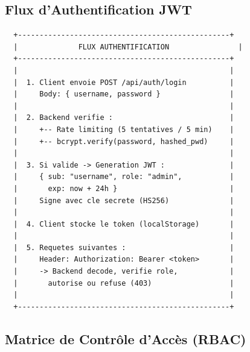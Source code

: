 \documentclass[12pt,a4paper]{article}
\begin{document}
\subsection{Flux d'Authentification JWT}

\begin{verbatim}
  +-------------------------------------------------+
  |              FLUX AUTHENTIFICATION                |
  +-------------------------------------------------+
  |                                                 |
  |  1. Client envoie POST /api/auth/login          |
  |     Body: { username, password }                |
  |                                                 |
  |  2. Backend verifie :                           |
  |     +-- Rate limiting (5 tentatives / 5 min)    |
  |     +-- bcrypt.verify(password, hashed_pwd)     |
  |                                                 |
  |  3. Si valide -> Generation JWT :               |
  |     { sub: "username", role: "admin",           |
  |       exp: now + 24h }                          |
  |     Signe avec cle secrete (HS256)              |
  |                                                 |
  |  4. Client stocke le token (localStorage)       |
  |                                                 |
  |  5. Requetes suivantes :                        |
  |     Header: Authorization: Bearer <token>       |
  |     -> Backend decode, verifie role,            |
  |       autorise ou refuse (403)                  |
  |                                                 |
  +-------------------------------------------------+
\end{verbatim}

\subsection{Matrice de Contrôle d'Accès (RBAC)}
\end{document}

